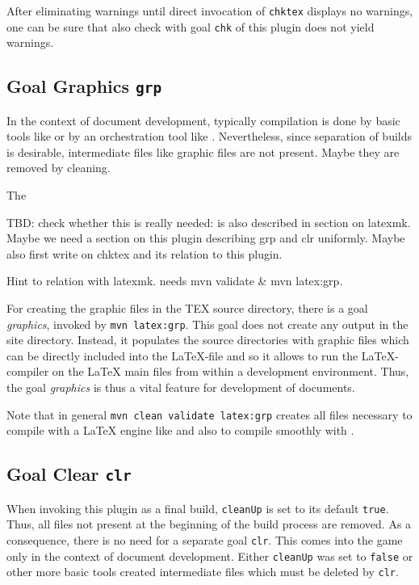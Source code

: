 After eliminating warnings until direct invocation of \texttt{chktex} displays no warnings, 
one can be sure that also check with goal \texttt{chk} of this plugin does not yield warnings. 


\subsection{Goal Graphics \texttt{grp}}\label{subsec:develGraph}

In the context of document development, 
typically compilation is done by basic tools like \lualatex{} 
or by an orchestration tool like . 
Nevertheless, since separation of builds is desirable, 
intermediate files like graphic files are not present. 
Maybe they are removed by cleaning. 

The 

TBD\@: check whether this is really needed: is also described in section on latexmk. 
Maybe we need a section on this plugin describing grp and clr uniformly. 
Maybe also first write on chktex and its relation to this plugin. 

Hint to relation with latexmk. 
needs mvn validate \& mvn latex:grp. 

For creating the graphic files in the TEX source directory, 
there is a goal \emph{graphics}, invoked by \texttt{mvn latex:grp}. 
This goal does not create any output in the site directory. 
Instead, it populates the source directories 
with graphic files which can be directly included into the \LaTeX-file 
and so it allows to run the \LaTeX-compiler on the \LaTeX{} main files 
from within a development environment. 
Thus, the goal \emph{graphics} is thus a vital feature 
for development of documents. 


Note that in general \texttt{mvn clean validate latex:grp} 
creates all files necessary to compile with a \LaTeX{} engine like \lualatex{} 
and also to compile smoothly with . 



\subsection{Goal Clear \texttt{clr}}\label{subsec:develClear}

When invoking this plugin as a final build, 
\texttt{cleanUp} is set to its default \texttt{true}. 
Thus, all files not present at the beginning of the build process are removed. 
As a consequence, there is no need for a separate goal \texttt{clr}. 
This comes into the game only in the context of document development. 
Either \texttt{cleanUp} was set to \texttt{false} 
or other more basic tools created intermediate files which must be deleted by \texttt{clr}. 

